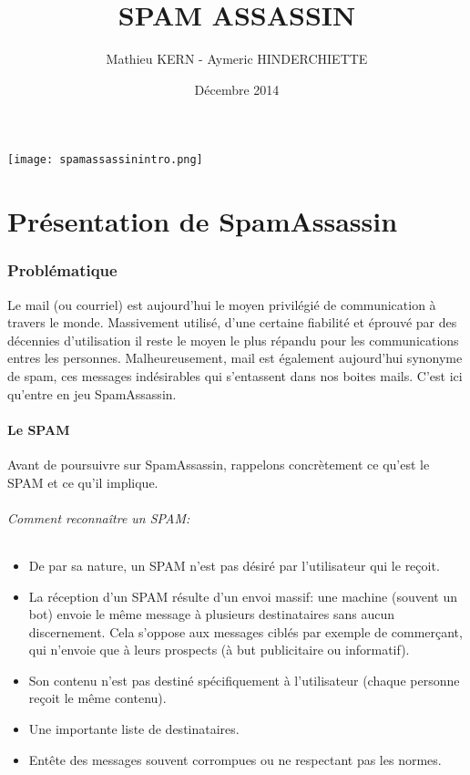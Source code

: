 \documentclass[a4paper,11pt]{article}
\title{SPAM ASSASSIN}
\date{Décembre 2014}
\author{Mathieu KERN - Aymeric HINDERCHIETTE}
\begin{document}
\maketitle
\texttt{[image: spamassassinintro.png]}
\pagebreak

\tableofcontents

\pagebreak

\part{Présentation de SpamAssassin}

\section{Problématique }

  Le mail (ou courriel) est aujourd'hui le moyen privilégié de communication à travers le monde. Massivement utilisé, 
d'une certaine fiabilité et éprouvé par des décennies d'utilisation il reste le moyen le plus répandu pour 
les communications entres les personnes. Malheureusement, mail est également aujourd'hui synonyme de spam, ces messages
indésirables qui s'entassent dans nos boites mails. C'est ici qu'entre en jeu SpamAssassin.

\subsection{Le SPAM}
Avant de poursuivre sur SpamAssassin, rappelons concrètement ce qu'est le SPAM et ce qu'il implique. 

\paragraph{Comment reconnaître un SPAM:}

\begin{itemize}
 \item De par sa nature, un SPAM n'est pas désiré par l'utilisateur qui le reçoit. 
 \item La réception d'un SPAM résulte d'un envoi massif: une machine (souvent un bot) envoie le même message 
 à plusieurs destinataires sans aucun discernement. Cela s'oppose aux messages ciblés par exemple de commerçant,
 qui n’envoie que à leurs prospects (à but publicitaire ou informatif).
 \item Son contenu n'est pas destiné spécifiquement à l'utilisateur (chaque personne reçoit le même contenu).
 \item Une importante liste de destinataires.
 \item Entête des messages souvent corrompues ou ne respectant pas les normes.
\end{itemize}
\end{document}
